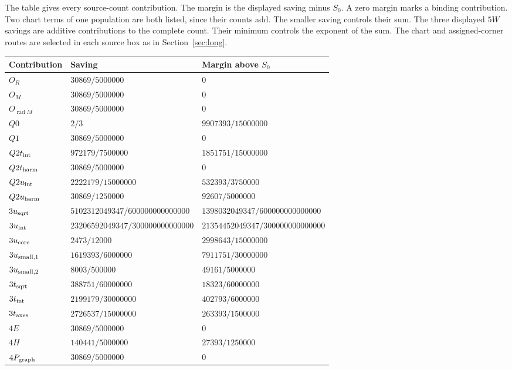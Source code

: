 The table gives every source-count contribution. The margin is
the displayed saving minus $S_0$. A zero margin marks a binding contribution.
Two chart terms of one population are both listed, since their counts
add. The smaller saving controls their sum. The three
displayed $5W$ savings are additive contributions to the complete
count. Their minimum controls the exponent of the sum. The chart and
assigned-corner routes are selected in each source box as in
Section~\ref{sec:long}.
\small
\unnumtable
\newcommand{\fivewdecimal}[1]{\text{\scriptsize (#1)}}
\begin{longtable}{@{}p{}p{}p{}@{}}
\toprule
Contribution & Saving & Margin above $S_0$\\
\midrule
\endhead
$O_R$ & $30869/5000000$ & $0$\\
$O_M$ & $30869/5000000$ & $0$\\
$O_{\operatorname{rad}M}$ & $30869/5000000$ & $0$\\
$Q0$ & $2/3$ & $9907393/15000000$\\
$Q1$ & $30869/5000000$ & $0$\\
$Q2t_{\rm int}$ & $972179/7500000$ & $1851751/15000000$\\
$Q2t_{\rm harm}$ & $30869/5000000$ & $0$\\
$Q2u_{\rm int}$ & $2222179/15000000$ & $532393/3750000$\\
$Q2u_{\rm harm}$ & $30869/1250000$ & $92607/5000000$\\
$3u_{\rm sqrt}$ & $5102312049347/600000000000000$ & $1398032049347/600000000000000$\\
$3u_{\rm int}$ & $23206592049347/300000000000000$ & $21354452049347/300000000000000$\\
$3u_{\rm core}$ & $2473/12000$ & $2998643/15000000$\\
$3u_{\rm small,1}$ & $1619393/6000000$ & $7911751/30000000$\\
$3u_{\rm small,2}$ & $8003/500000$ & $49161/5000000$\\
$3t_{\rm sqrt}$ & $388751/60000000$ & $18323/60000000$\\
$3t_{\rm int}$ & $2199179/30000000$ & $402793/6000000$\\
$3t_{\rm axes}$ & $2726537/15000000$ & $263393/1500000$\\
$4E$ & $30869/5000000$ & $0$\\
$4H$ & $140441/5000000$ & $27393/1250000$\\
$4P_{\rm graph}$ & $30869/5000000$ & $0$\\

\end{longtable}
